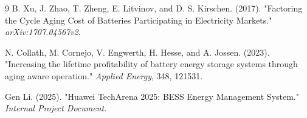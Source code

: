 \documentclass[11pt, a4paper]{article}
\begin{document}
\begin{thebibliography}{9}
B. Xu, J. Zhao, T. Zheng, E. Litvinov, and D. S. Kirschen. (2017). "Factoring the Cycle Aging Cost of Batteries Participating in Electricity Markets." \textit{arXiv:1707.04567v2}.

N. Collath, M. Cornejo, V. Engwerth, H. Hesse, and A. Jossen. (2023). "Increasing the lifetime profitability of battery energy storage systems through aging aware operation." \textit{Applied Energy}, 348, 121531.

Gen Li. (2025). "Huawei TechArena 2025: BESS Energy Management System." \textit{Internal Project Document}.
\end{thebibliography}
\end{document}
